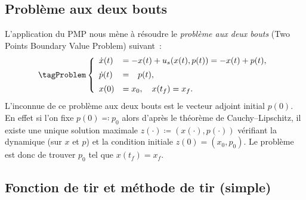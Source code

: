 \subsection{Probl\`eme aux deux bouts}

L'application du PMP nous m\`ene \`a r\'esoudre le \emph{probl\`eme aux deux bouts} (Two Points Boundary Value Problem) suivant~:
    \leqnomode
    \begin{equation}
    \tagProblem
        \left\{ 
            \begin{array}{ll}
                \dot{x}(t)  & = -x(t) + u_s(x(t),p(t)) = -x(t)+p(t),              \\[0.5em]
                \dot{p}(t)  & = \phantom{-}p(t),                                    \\[0.5em]
                x(0)        & = x_0, \quad x(t_f) = x_f.
            \end{array}
        \right. 
        \label{eq:bvpSimple}
    \end{equation}
    \reqnomode
    L'inconnue de ce probl\`eme aux deux bouts est le vecteur adjoint initial $p(0)$.
    En effet si l'on fixe $p(0) \eqqcolon p_0$ alors d'apr\`es le th\'eor\`eme de Cauchy--Lipschitz, il existe une unique solution maximale
    $z(\cdot)\coloneqq(x(\cdot),p(\cdot))$ v\'erifiant la dynamique (sur $x$ et $p$) et la condition initiale $z(0) = (x_0,p_0)$.
    Le probl\`eme est donc de trouver $p_0$ tel que $x(t_f) = x_f$.

\subsection{Fonction de tir et m\'ethode de tir (simple)}

